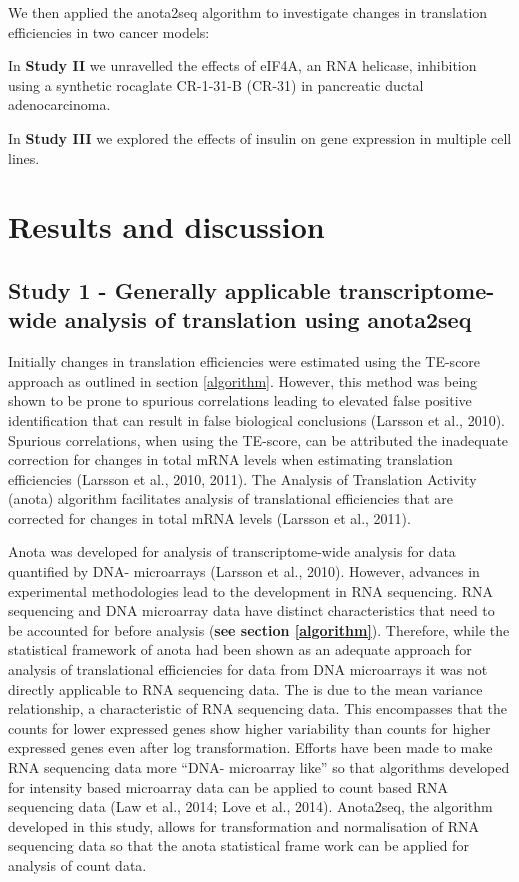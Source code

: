\documentclass[12pt,openany]{book}
\begin{document}
We then applied the anota2seq algorithm to investigate changes in
translation efficiencies in two cancer models:

In \textbf{Study II} we unravelled the effects of eIF4A, an RNA
helicase, inhibition using a synthetic rocaglate CR-1-31-B (CR-31) in
pancreatic ductal adenocarcinoma.

In \textbf{Study III} we explored the effects of insulin on gene
expression in multiple cell lines.

\chapter{Results and discussion}

\section{Study 1 - Generally applicable transcriptome-wide analysis of translation using anota2seq}

Initially changes in translation efficiencies were estimated using the
TE-score approach as outlined in section \ref{algorithm}. However, this
method was being shown to be prone to spurious correlations leading to
elevated false positive identification that can result in false
biological conclusions (Larsson et al., 2010). Spurious correlations,
when using the TE-score, can be attributed the inadequate correction for
changes in total mRNA levels when estimating translation efficiencies
(Larsson et al., 2010, 2011). The Analysis of Translation Activity
(anota) algorithm facilitates analysis of translational efficiencies
that are corrected for changes in total mRNA levels (Larsson et al.,
2011).

Anota was developed for analysis of transcriptome-wide analysis for data
quantified by DNA- microarrays (Larsson et al., 2010). However, advances
in experimental methodologies lead to the development in RNA sequencing.
RNA sequencing and DNA microarray data have distinct characteristics
that need to be accounted for before analysis (\textbf{see section
\ref{algorithm}}). Therefore, while the statistical framework of anota
had been shown as an adequate approach for analysis of translational
efficiencies for data from DNA microarrays it was not directly
applicable to RNA sequencing data. The is due to the mean variance
relationship, a characteristic of RNA sequencing data. This encompasses
that the counts for lower expressed genes show higher variability than
counts for higher expressed genes even after log transformation. Efforts
have been made to make RNA sequencing data more ``DNA- microarray like''
so that algorithms developed for intensity based microarray data can be
applied to count based RNA sequencing data (Law et al., 2014; Love et
al., 2014). Anota2seq, the algorithm developed in this study, allows for
transformation and normalisation of RNA sequencing data so that the
anota statistical frame work can be applied for analysis of count data.
\end{document}
